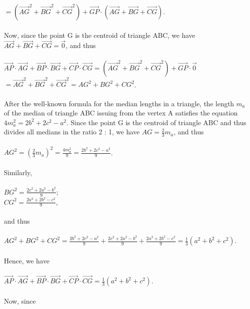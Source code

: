 $=\left( \overrightarrow{AG}^2+\overrightarrow{BG}^2+\overrightarrow{CG}^2\right) +\overrightarrow{GP}\cdot \left( \overrightarrow{AG}+\overrightarrow{BG}+\overrightarrow{CG}\right) $. \\\\
Now, since the point G is the centroid of triangle ABC, we have $\overrightarrow{AG}+\overrightarrow{BG}+\overrightarrow{CG}=\overrightarrow{0}$, and thus \\\\
$\overrightarrow{AP}\cdot \overrightarrow{AG}+\overrightarrow{BP}\cdot \overrightarrow{BG}+\overrightarrow{CP}\cdot \overrightarrow{CG}=\left( \overrightarrow{AG}^2+\overrightarrow{BG}^2+\overrightarrow{CG}^2\right) +\overrightarrow{GP}\cdot \overrightarrow{0}$ \\
$=\overrightarrow{AG}^2+\overrightarrow{BG}^2+\overrightarrow{CG}^2=AG^2+BG^2+CG^2$. \\\\
After the well-known formula for the median lengths in a triangle, the length $m_a$ of the median of triangle ABC issuing from the vertex A satisfies the equation $4m_a^2=2b^2+2c^2-a^2$. Since the point G is the centroid of triangle ABC and thus divides all medians in the ratio 2 : 1, we have $AG=\frac23 m_a$, and thus \\\\
$AG^2=\left( \frac23 m_a\right) ^2=\frac{4m_a^2}{9}=\frac{2b^2+2c^2-a^2}{9}$. \\\\
Similarly, \\\\
$BG^2=\frac{2c^2+2a^2-b^2}{9}$; \\
$CG^2=\frac{2a^2+2b^2-c^2}{9}$, \\\\
and thus \\\\
$AG^2+BG^2+CG^2=\frac{2b^2+2c^2-a^2}{9}+\frac{2c^2+2a^2-b^2}{9}+\frac{2a^2+2b^2-c^2}{9}=\frac13 \left( a^2+b^2+c^2\right) $. \\\\
Hence, we have \\\\
$\overrightarrow{AP}\cdot \overrightarrow{AG}+\overrightarrow{BP}\cdot \overrightarrow{BG}+\overrightarrow{CP}\cdot \overrightarrow{CG}=\frac13 \left( a^2+b^2+c^2\right) $. \\\\
Now, since \\\\
